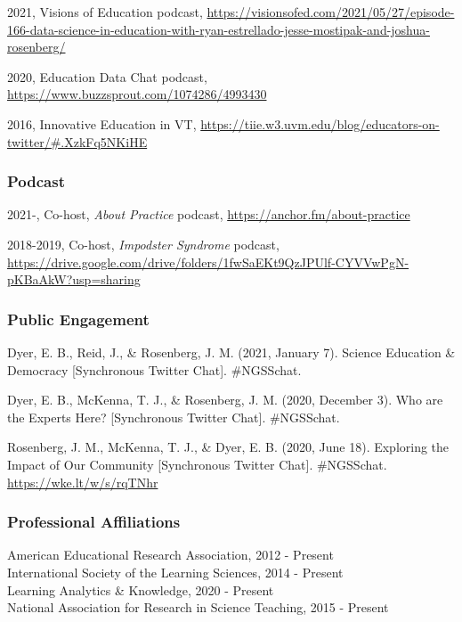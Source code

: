 \documentclass[
  14,
]{article}
\begin{document}
2021, Visions of Education podcast,
\url{https://visionsofed.com/2021/05/27/episode-166-data-science-in-education-with-ryan-estrellado-jesse-mostipak-and-joshua-rosenberg/}

2020, Education Data Chat podcast,
\url{https://www.buzzsprout.com/1074286/4993430}

2016, Innovative Education in VT,
\url{https://tiie.w3.uvm.edu/blog/educators-on-twitter/\#.XzkFq5NKiHE}

\hypertarget{podcast}{%
\subsubsection{Podcast}\label{podcast}}

2021-, Co-host, \emph{About Practice} podcast,
\url{https://anchor.fm/about-practice}

2018-2019, Co-host, \emph{Impodster Syndrome} podcast,
\url{https://drive.google.com/drive/folders/1fwSaEKt9QzJPUlf-CYVVwPgN-pKBaAkW?usp=sharing}

\hypertarget{public-engagement}{%
\subsubsection{Public Engagement}\label{public-engagement}}

Dyer, E. B., Reid, J., \& Rosenberg, J. M. (2021, January 7). Science
Education \& Democracy {[}Synchronous Twitter Chat{]}. \#NGSSchat.

Dyer, E. B., McKenna, T. J., \& Rosenberg, J. M. (2020, December 3). Who
are the Experts Here? {[}Synchronous Twitter Chat{]}. \#NGSSchat.

Rosenberg, J. M., McKenna, T. J., \& Dyer, E. B. (2020, June 18).
Exploring the Impact of Our Community {[}Synchronous Twitter Chat{]}.
\#NGSSchat. \url{https://wke.lt/w/s/rqTNhr}

\hypertarget{professional-affiliations}{%
\subsubsection{Professional
Affiliations}\label{professional-affiliations}}

American Educational Research Association, 2012 - Present\\
International Society of the Learning Sciences, 2014 - Present\\
Learning Analytics \& Knowledge, 2020 - Present\\
National Association for Research in Science Teaching, 2015 - Present
\end{document}
